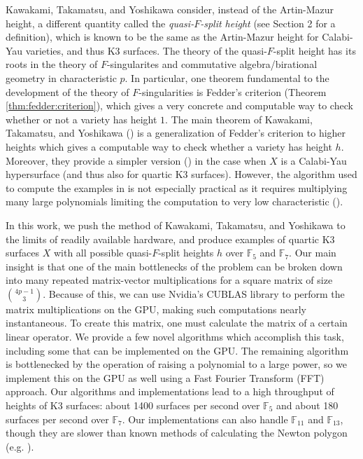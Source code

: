 Kawakami, Takamatsu, and Yoshikawa consider, 
instead of the Artin-Mazur height, a different quantity called the
\textit{quasi-\(F\)-split height} 
(see Section 2 for a definition),
which is known to be the same as the Artin-Mazur height
for Calabi-Yau varieties, and thus K3 surfaces.
The theory of the quasi-\(F\)-split height has its
roots in the theory of \(F\)-singularites and commutative
algebra/birational geometry in characteristic \(p\).
In particular, one theorem fundamental
to the development of the theory of \(F\)-singularities
is Fedder's criterion (Theorem \ref{thm:fedder:criterion}), 
which gives a very concrete and computable way to check
whether or not a variety has height \(1\).
The main theorem of Kawakami, Takamatsu, and Yoshikawa
(\cite[Theorem~A]{kty-2022-fedder})
is a generalization of Fedder's criterion
to higher heights which gives a 
computable way to check whether a variety has height \(h\).
Moreover, they provide a simpler version
(\cite[Theorem~C]{kty-2022-fedder})
in the case when \(X\) is a Calabi-Yau hypersurface
(and thus also for quartic K3 surfaces).
However, the algorithm used to compute the examples in
\cite{kty-2022-fedder}
is not especially practical
as it requires multiplying many large polynomials
limiting the computation to
very low characteristic
(\cite{takamatsu-2024-algorithm}).


In this work, we push the method of Kawakami,
Takamatsu, and Yoshikawa to the limits of readily
available hardware, 
and produce examples of quartic K3 surfaces \(X\) with all
possible quasi-\(F\)-split heights \(h\) 
over \(\mathbb{F}_{5}\) and \(\mathbb{F}_{7}\).
Our main insight is that one of the main
bottlenecks of the problem can be broken down 
into many repeated matrix-vector
multiplications for a square matrix of size 
\(\binom{4p-1}{3}\).
Because of this, we can use Nvidia's CUBLAS library 
\cite{nvidia-2024-cublas}
to perform the matrix multiplications
on the GPU, making such computations
nearly instantaneous.
To create this matrix, one must calculate the matrix of a
certain linear operator.
We provide a few novel algorithms which accomplish this task,
including some that can be implemented on the GPU.
The remaining algorithm is bottlenecked by the operation
of raising a polynomial to a large power, 
so we implement this on the GPU as well using 
a Fast Fourier Transform (FFT) approach.
Our algorithms and implementations lead to a high throughput
of heights of K3 surfaces: 
about 1400 surfaces per second over \(\mathbb{F}_{5}\) and
about 180 surfaces per second over \(\mathbb{F}_{7}\).
Our implementations can also handle \(\mathbb{F}_{11}\) 
and \(\mathbb{F}_{13}\), though they are slower than known methods
of calculating the Newton polygon (e.g. 
\cite{chk-2019-toric-controlled-reduction}).

